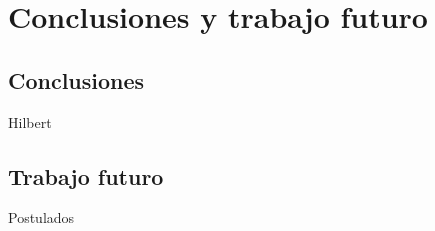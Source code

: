 \cleardoublepage

\chapter{Conclusiones y trabajo futuro}
\label{Cap5:Conclusion}

\section{Conclusiones}
\label{Sec5.1:Conclusion}
Hilbert \n

\section{Trabajo futuro}
\label{Sec5.2:Futuro}
Postulados \n